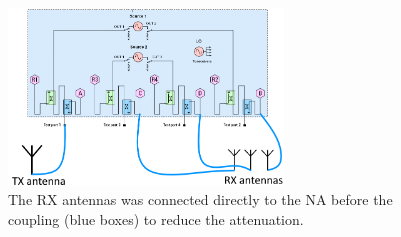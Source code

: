 \begin{figure}[H]
\centering
\includegraphics[width=0.65\textwidth]{figures/Gimp_figures/4portVNA.png}
\caption{The RX antennas was connected directly to the NA before the coupling (blue boxes) to reduce the attenuation. \citep{Key_PNA}}
\label{connection_diagram}
\end{figure}



%
%




